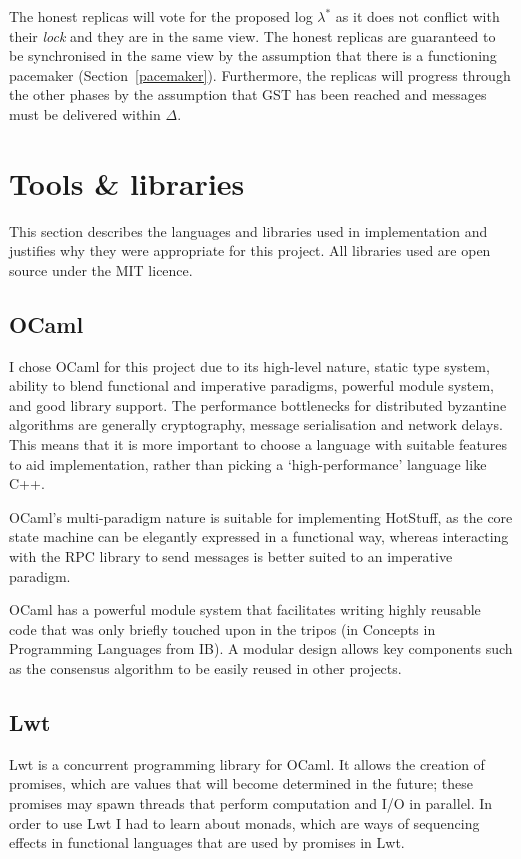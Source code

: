 The honest replicas will vote for the proposed log $\lambda^*$ as it does not conflict with their \textit{lock} and they are in the same view. The honest replicas are guaranteed to be synchronised in the same view by the assumption that there is a functioning pacemaker (Section~\ref{pacemaker}). Furthermore, the replicas will progress through the other phases by the assumption that GST has been reached and messages must be delivered within $\Delta$.

\section{Tools \& libraries} \label{tools}
This section describes the languages and libraries used in implementation and justifies why they were appropriate for this project. All libraries used are open source under the MIT licence.

\subsection{OCaml}
I chose OCaml \cite{ocaml} for this project due to its high-level nature, static type system, ability to blend functional and imperative paradigms, powerful module system, and good library support. The performance bottlenecks for distributed byzantine algorithms are generally cryptography, message serialisation and network delays. This means that it is more important to choose a language with suitable features to aid implementation, rather than picking a `high-performance' language like C++.

OCaml's multi-paradigm nature is suitable for implementing HotStuff, as the core state machine can be elegantly expressed in a functional way, whereas interacting with the RPC library to send messages is better suited to an imperative paradigm.

OCaml has a powerful module system that facilitates writing highly reusable code that was only briefly touched upon in the tripos (in Concepts in Programming Languages from IB). A modular design allows key components such as the consensus algorithm to be easily reused in other projects.

\subsection{Lwt}
Lwt \cite{lwt} is a concurrent programming library for OCaml. It allows the creation of promises, which are values that will become determined in the future; these promises may spawn threads that perform computation and I/O in parallel. In order to use Lwt I had to learn about monads, which are ways of sequencing effects in functional languages that are used by promises in Lwt.

